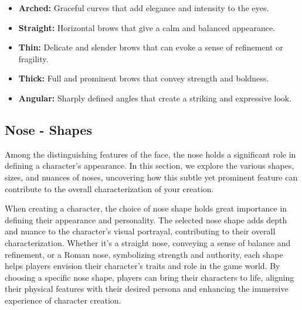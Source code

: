 \begin{itemize}
    \item \textbf{Arched:} Graceful curves that add elegance and intensity to the eyes.
    \item \textbf{Straight:} Horizontal brows that give a calm and balanced appearance.
    \item \textbf{Thin:} Delicate and slender brows that can evoke a sense of refinement or fragility.
    \item \textbf{Thick:} Full and prominent brows that convey strength and boldness.
    \item \textbf{Angular:} Sharply defined angles that create a striking and expressive look.
\end{itemize}

\subsection{\textbf{Nose - Shapes}}

Among the distinguishing features of the face, the nose holds a significant role in defining a character's appearance. In this section, we explore the various shapes, sizes, and nuances of noses, uncovering how this subtle yet prominent feature can contribute to the overall characterization of your creation.

When creating a character, the choice of nose shape holds great importance in defining their appearance and personality. The selected nose shape adds depth and nuance to the character's visual portrayal, contributing to their overall characterization. Whether it's a straight nose, conveying a sense of balance and refinement, or a Roman nose, symbolizing strength and authority, each shape helps players envision their character's traits and role in the game world. By choosing a specific nose shape, players can bring their characters to life, aligning their physical features with their desired persona and enhancing the immersive experience of character creation.

